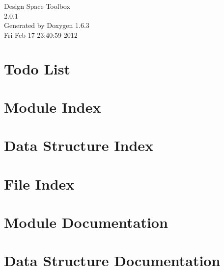 \documentclass[a4paper]{book}
\begin{document}
\hypersetup{pageanchor=false}
\begin{titlepage}
\vspace*{7cm}
\begin{center}
{\Large Design Space Toolbox \\[1ex]\large 2.0.1 }\\
\vspace*{1cm}
{\large Generated by Doxygen 1.6.3}\\
\vspace*{0.5cm}
{\small Fri Feb 17 23:40:59 2012}\\
\end{center}
\end{titlepage}
\clearemptydoublepage
{}
\tableofcontents
\clearemptydoublepage
{}
\hypersetup{pageanchor=true}
\chapter{Todo List}
\label{todo}
\hypertarget{todo}{}

\chapter{Module Index}

\chapter{Data Structure Index}

\chapter{File Index}

\chapter{Module Documentation}







\chapter{Data Structure Documentation}




























\end{document}
